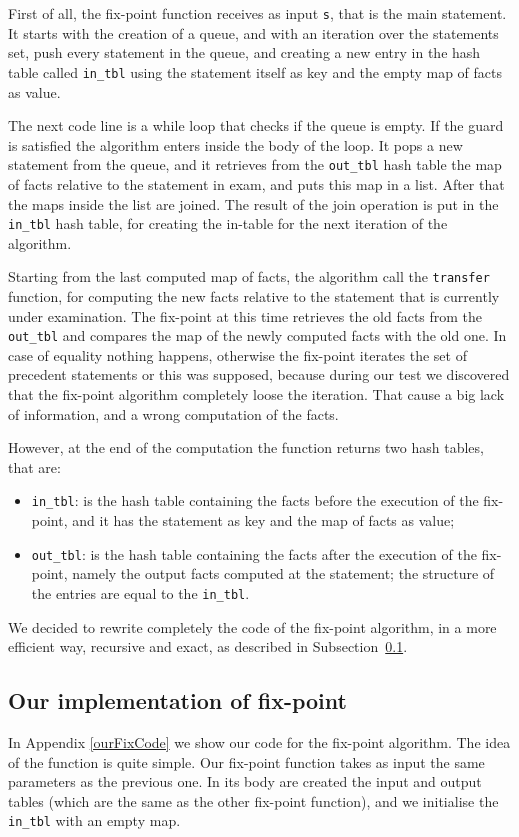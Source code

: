 \documentclass[a4paper]{article}   %
\begin{document}
First of all, the fix-point function receives as input \texttt{s}, that is the main statement. It starts with the creation of a queue, and with an iteration over the statements set, push every statement in the queue, and creating a new entry in the hash table called \texttt{in\_tbl} using the statement itself as key and the empty map of facts as value.

The next code line is a while loop that checks if the queue is empty. If the guard is satisfied the algorithm enters inside the body of the loop. It pops a new statement from the queue, and it retrieves from the \texttt{out\_tbl} hash table the map of facts relative to the statement in exam, and puts this map in a list. After that the maps inside the list are joined. The result of the join operation is put in the \texttt{in\_tbl} hash table, for creating the in-table for the next iteration of the algorithm.

Starting from the last computed map of facts, the algorithm call the \texttt{transfer} function, for computing the new facts relative to the statement that is currently under examination. The fix-point at this time retrieves the old facts from the \texttt{out\_tbl} and compares the map of the newly computed facts with the old one. In case of equality nothing happens, otherwise the fix-point iterates the set of precedent statements or this was supposed, because during our test we discovered that the fix-point algorithm completely loose the iteration. That cause a big lack of information, and a wrong computation of the facts.

However, at the end of the computation the function returns two hash tables, that are:
\begin{itemize}
\item \texttt{in\_tbl}: is the hash table containing the facts before the execution of the fix-point, and it has the statement as key and the map of facts as value;
\item \texttt{out\_tbl}: is the hash table containing the facts after the execution of the fix-point, namely the output facts computed at the statement; the structure of the entries are equal to the \texttt{in\_tbl}.
\end{itemize}

We decided to rewrite completely the code of the fix-point algorithm, in a more efficient way, recursive and exact, as described in Subsection~\ref{ourFix}.

\subsection{Our implementation of fix-point}
\label{ourFix}
In Appendix \ref{ourFixCode} we show our code for the fix-point algorithm.
The idea of the function is quite simple.
Our fix-point function takes as input the same parameters as the previous one. 
In its body are created the input and output tables (which are the same as the other fix-point function),
%
and we initialise the \texttt{in\_tbl} with an empty map.
\end{document}
